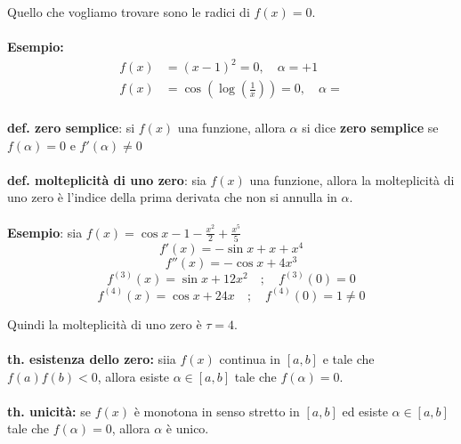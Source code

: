 \documentclass[a4paper, 11pt]{article}
\begin{document}
        
        Quello che vogliamo trovare sono le radici di \( f(x) = 0 \).

        \paragraph{}
        \textbf{Esempio:}
        \begin{align*}
            f(x) &= (x - 1)^2 = 0, \quad \text{$\alpha = +1$} \\
            f(x) &= \cos\left(\log\left(\frac{1}{x}\right)\right) = 0, \quad \text{$\alpha =  $}
        \end{align*}
           
        

        \paragraph{}
        \textbf{def. zero semplice}: si $f(x)$ una funzione, allora $\alpha$ si dice \textbf{zero semplice} se $f(\alpha) = 0$ e $f'(\alpha) \neq 0 $

        \paragraph{}
        \textbf{def. molteplicità di uno zero}: sia $f(x)$ una funzione, allora la molteplicità di uno zero è l'indice della prima derivata che non si annulla in $\alpha$.

        \paragraph{}
        \textbf{Esempio}: sia $f(x) = \cos{x}-1-\frac{x^2}{2}+\frac{x^5}{5}$
        \[ f'(x) = -\sin x + x + x^4 \]
        \[ f''(x) = -\cos x + 4x^3 \]
        \[ f^{(3)}(x) = \sin x + 12x^2 \quad ; \quad f^{(3)}(0) = 0 \]
        \[ f^{(4)}(x) = \cos x + 24x \quad ; \quad f^{(4)}(0) = 1 \neq 0 \]
        

        Quindi la molteplicità di uno zero è \( \tau = 4 \).

        \paragraph{}
        \textbf{th. esistenza dello zero:} siia \( f(x) \) continua in \([a,b]\) e tale che \( f(a)f(b) < 0 \), allora esiste \( \alpha \in [a,b] \) tale che \( f(\alpha) = 0 \).

        \paragraph{}
        \textbf{th. unicità:} se \( f(x) \) è monotona in senso stretto in \([a,b]\) ed esiste \( \alpha \in [a,b] \) tale che \( f(\alpha) = 0 \), allora \( \alpha \) è unico.
\end{document}
